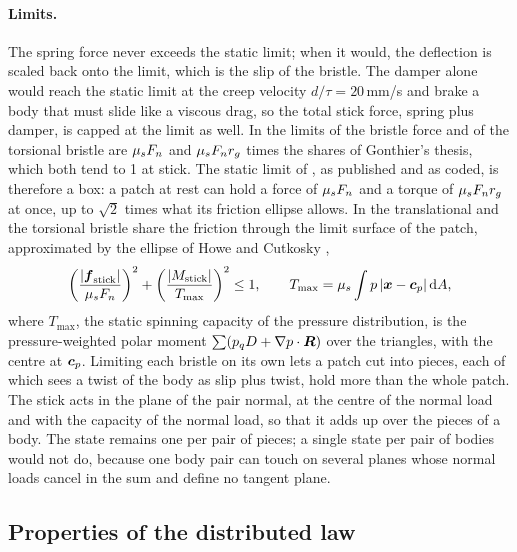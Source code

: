 \paragraph{Limits.} The spring force never exceeds the static limit; when it would, the
deflection is scaled back onto the limit, which is the slip of the bristle. The damper alone
would reach the static limit at the creep velocity $d/\tau = 20$\,mm/s and brake a body that
must slide like a viscous drag, so the total stick force, spring plus damper, is capped at the
limit as well. In  the limits of the bristle force and of the torsional bristle are
$\mu_sF_n$ and $\mu_sF_n r_g$ times the shares of Gonthier's thesis, which both tend to 1 at
stick. The static limit of , as published and as coded, is therefore a box: a
patch at rest can hold a force of $\mu_sF_n$ and a torque of $\mu_sF_n r_g$ at once, up to
$\sqrt2$ times what its friction ellipse allows. In  the translational and the
torsional bristle share the friction through the limit surface of the patch, approximated by
the ellipse of Howe and Cutkosky \cite{Howe1996},
\begin{equation}
  \left(\frac{|\boldsymbol{f}_\mathrm{stick}|}{\mu_sF_n}\right)^2
  + \left(\frac{|M_\mathrm{stick}|}{T_\mathrm{max}}\right)^2 \le 1 ,
  \qquad T_\mathrm{max} = \mu_s\int p\,|\boldsymbol{x} - \boldsymbol{c}_p|\,\mathrm{d} A ,
  \label{eq:ellipse}
\end{equation}
where $T_\mathrm{max}$, the static spinning capacity of the pressure distribution, is the
pressure-weighted polar moment $\sum(p_q D + \nabla p\cdot\boldsymbol{R})$ over the triangles, with
the centre at $\boldsymbol{c}_p$. Limiting each bristle on its own lets a patch cut into pieces, each
of which sees a twist of the body as slip plus twist, hold more than the whole patch. The stick
acts in the plane of the pair normal, at the centre of the normal load and with the capacity of
the normal load, so that it adds up over the pieces of a body. The state remains one per pair
of pieces; a single state per pair of bodies would not do, because one body pair can touch on
several planes whose normal loads cancel in the sum and define no tangent plane.

\subsection{Properties of the distributed law}

